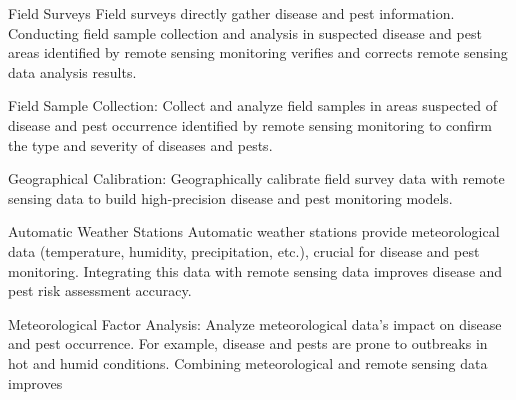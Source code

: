 Field Surveys
Field surveys directly gather disease and pest information. Conducting field sample collection and analysis in suspected disease and pest areas identified by remote sensing monitoring verifies and corrects remote sensing data analysis results.

Field Sample Collection: Collect and analyze field samples in areas suspected of disease and pest occurrence identified by remote sensing monitoring to confirm the type and severity of diseases and pests.

Geographical Calibration: Geographically calibrate field survey data with remote sensing data to build high-precision disease and pest monitoring models.

Automatic Weather Stations
Automatic weather stations provide meteorological data (temperature, humidity, precipitation, etc.), crucial for disease and pest monitoring. Integrating this data with remote sensing data improves disease and pest risk assessment accuracy.

Meteorological Factor Analysis: Analyze meteorological data's impact on disease and pest occurrence. For example, disease and pests are prone to outbreaks in hot and humid conditions. Combining meteorological and remote sensing data improves
